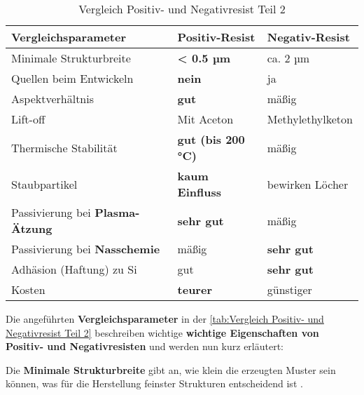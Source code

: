 \documentclass{article} %
\begin{document}
\begin{table}[htb!]
    \centering
    \renewcommand{\arraystretch}{1.5} %
    \begin{tabular}{|p{6cm}|p{3cm}|p{3cm}|}
        \hline
        \textbf{Vergleichsparameter} & \textbf{Positiv-Resist} & \textbf{Negativ-Resist} \\ \hline
        Minimale Strukturbreite & \textbf{< 0.5 µm} & ca. 2 µm \\ \hline
        Quellen beim Entwickeln & \textbf{nein} & ja \\ \hline
        Aspektverhältnis & \textbf{gut} & mäßig \\ \hline
        Lift-off & Mit Aceton & Methylethylketon \\ \hline
        Thermische Stabilität & \textbf{gut (bis 200 °C)} & mäßig \\ \hline
        Staubpartikel & \textbf{kaum Einfluss} & bewirken Löcher \\ \hline
        Passivierung bei \textbf{Plasma-Ätzung} & \textbf{sehr gut} & mäßig \\ \hline
        Passivierung bei \textbf{Nasschemie} & mäßig & \textbf{sehr gut} \\ \hline
        Adhäsion (Haftung) zu Si & gut & \textbf{sehr gut} \\ \hline
        Kosten & \textbf{teurer} & günstiger \\ \hline
    \end{tabular}
    \captionsetup{labelfont=bf} %
    \caption{Vergleich Positiv- und Negativresist Teil 2 \cite{madou2002, wolf2000}}
    \label{tab:Vergleich Positiv- und Negativresist Teil 2}
\end{table}  

\vspace{1em}

Die angeführten \textbf{Vergleichsparameter} in der \autoref{tab:Vergleich Positiv- und Negativresist Teil 2} beschreiben wichtige \textbf{wichtige Eigenschaften von Positiv- und Negativresisten} und werden nun kurz erläutert: 

\vspace{1em}

Die \textbf{Minimale Strukturbreite} gibt an, wie klein die erzeugten Muster sein können, was für die Herstellung feinster Strukturen entscheidend ist \cite{madou2002, sciencedirect_photoresist}. 

\vspace{1em}
\end{document}
